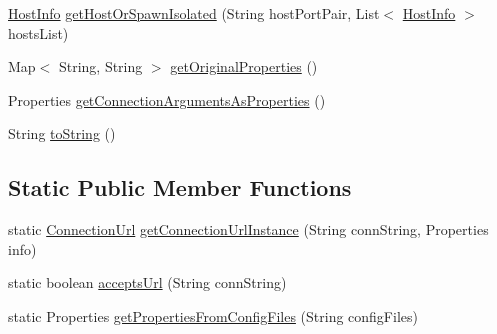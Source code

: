 \begin{DoxyCompactItemize}
\item 
\mbox{\hyperlink{classcom_1_1mysql_1_1cj_1_1conf_1_1_host_info}{Host\+Info}} \mbox{\hyperlink{classcom_1_1mysql_1_1cj_1_1conf_1_1_connection_url_a16fceddeee9baa86584b1f5ab7e55251}{get\+Host\+Or\+Spawn\+Isolated}} (String host\+Port\+Pair, List$<$ \mbox{\hyperlink{classcom_1_1mysql_1_1cj_1_1conf_1_1_host_info}{Host\+Info}} $>$ hosts\+List)
\item 
Map$<$ String, String $>$ \mbox{\hyperlink{classcom_1_1mysql_1_1cj_1_1conf_1_1_connection_url_a9d7c5ace6030f70b633a6f8505bca69b}{get\+Original\+Properties}} ()
\item 
Properties \mbox{\hyperlink{classcom_1_1mysql_1_1cj_1_1conf_1_1_connection_url_a4f0fd63fe4a3350fa258c293d5184e0a}{get\+Connection\+Arguments\+As\+Properties}} ()
\item 
String \mbox{\hyperlink{classcom_1_1mysql_1_1cj_1_1conf_1_1_connection_url_aa7ceabc22edf11585cc69a80637d4503}{to\+String}} ()
\end{DoxyCompactItemize}
\subsection*{Static Public Member Functions}
\begin{DoxyCompactItemize}
\item 
static \mbox{\hyperlink{classcom_1_1mysql_1_1cj_1_1conf_1_1_connection_url}{Connection\+Url}} \mbox{\hyperlink{classcom_1_1mysql_1_1cj_1_1conf_1_1_connection_url_af7958a22bfdda05d3b62f6149efed678}{get\+Connection\+Url\+Instance}} (String conn\+String, Properties info)
\item 
static boolean \mbox{\hyperlink{classcom_1_1mysql_1_1cj_1_1conf_1_1_connection_url_a8ec478bacf5da8da5353206a73d669c7}{accepts\+Url}} (String conn\+String)
\item 
static Properties \mbox{\hyperlink{classcom_1_1mysql_1_1cj_1_1conf_1_1_connection_url_ab0b909200aa45ca290930add14c8924e}{get\+Properties\+From\+Config\+Files}} (String config\+Files)
\end{DoxyCompactItemize}
